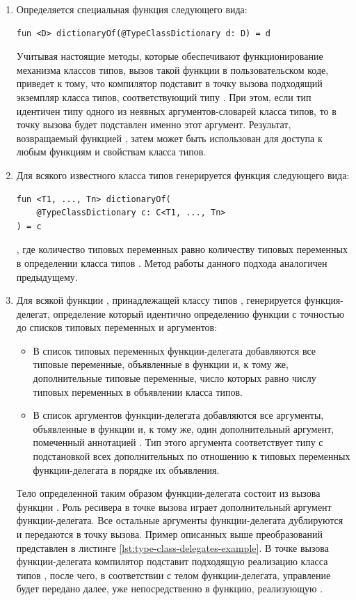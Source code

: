 \begin{enumerate}
    \item Определяется специальная функция следующего вида: 
    \begin{lstlisting}[style={wo_caption}]
fun <D> dictionaryOf(@TypeClassDictionary d: D) = d
    \end{lstlisting}
    Учитывая настоящие методы, которые обеспечивают функционирование механизма классов типов, вызов такой функции в пользовательском коде, приведет к тому, что компилятор подставит в точку вызова подходящий экземпляр класса типов, соответствующий типу . При этом, если тип  идентичен типу одного из неявных аргументов-словарей класса типов, то в точку вызова будет подставлен именно этот аргумент. Результат, возвращаемый функцией , затем может быть использован для доступа к любым функциям и свойствам класса типов.  
    \item Для всякого известного класса типов  генерируется функция следующего вида:
    \begin{lstlisting}[style={wo_caption}]
fun <T1, ..., Tn> dictionaryOf(
    @TypeClassDictionary c: C<T1, ..., Tn>
) = c
    \end{lstlisting}
    , где количество типовых переменных равно количеству типовых переменных в определении класса типов . Метод работы данного подхода аналогичен предыдущему. 
    \item Для всякой функции , принадлежащей классу типов , генерируется функция-делегат, определение который идентично определению функции  с точностью до списков типовых переменных и аргументов:
    \begin{itemize}
        \item В список типовых переменных функции-делегата добавляются все типовые переменные, объявленные в функции  и, к тому же, дополнительные типовые переменные, число которых равно числу типовых переменных в объявлении класса типов.
        \item В список аргументов функции-делегата добавляются все аргументы, объявленные в функции  и, к тому же, один дополнительный аргумент, помеченный аннотацией . Тип этого аргумента соответствует типу  с подстановкой всех дополнительных по отношению к  типовых переменных функции-делегата в порядке их объявления.   
    \end{itemize}
    Тело определенной таким образом функции-делегата  состоит из вызова функции . Роль ресивера в точке вызова играет дополнительный аргумент функции-делегата. Все остальные аргументы функции-делегата дублируются и передаются в точку вызова. Пример описанных выше преобразований представлен в листинге \ref{lst:type-class-delegates-example}. В точке вызова функции-делегата компилятор подставит подходящую реализацию класса типов , после чего, в соответствии с телом функции-делегата, управление будет передано далее, уже непосредственно в функцию, реализующую . 
\end{enumerate}

